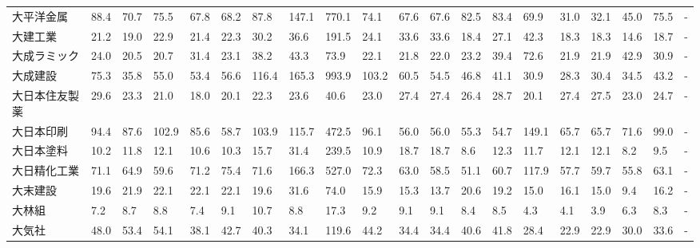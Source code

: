 \begin{longtable}[c]{lp{3mm}p{3mm}p{3mm}p{3mm}p{3mm}p{3mm}p{3mm}p{3mm}p{3mm}p{3mm}p{3mm}p{3mm}p{3mm}p{3mm}p{3mm}p{3mm}p{3mm}p{3mm}p{3mm}}
大平洋金属           &   88.4 &   70.7 &      75.5 &      67.8 &       68.2 &    87.8 &   147.1 &    770.1 &    74.1 &    67.6 &   67.6 &   82.5 &    83.4 &    69.9 &    31.0 &   32.1 &   45.0 &    75.5 &      - \\
大建工業            &   21.2 &   19.0 &      22.9 &      21.4 &       22.3 &    30.2 &    36.6 &    191.5 &    24.1 &    33.6 &   33.6 &   18.4 &    27.1 &    42.3 &    18.3 &   18.3 &   14.6 &    18.7 &      - \\
大成ラミック          &   24.0 &   20.5 &      20.7 &      31.4 &       23.1 &    38.2 &    43.3 &     73.9 &    22.1 &    21.8 &   22.0 &   23.2 &    39.4 &    72.6 &    21.9 &   21.9 &   42.9 &    30.9 &      - \\
大成建設            &   75.3 &   35.8 &      55.0 &      53.4 &       56.6 &   116.4 &   165.3 &    993.9 &   103.2 &    60.5 &   54.5 &   46.8 &    41.1 &    30.9 &    28.3 &   30.4 &   34.5 &    43.2 &      - \\
大日本住友製薬         &   29.6 &   23.3 &      21.0 &      18.0 &       20.1 &    22.3 &    23.6 &     40.6 &    23.0 &    27.4 &   27.4 &   26.4 &    28.7 &    20.1 &    27.4 &   27.5 &   23.0 &    24.7 &      - \\
大日本印刷           &   94.4 &   87.6 &     102.9 &      85.6 &       58.7 &   103.9 &   115.7 &    472.5 &    96.1 &    56.0 &   56.0 &   55.3 &    54.7 &   149.1 &    65.7 &   65.7 &   71.6 &    99.0 &      - \\
大日本塗料           &   10.2 &   11.8 &      12.1 &      10.6 &       10.3 &    15.7 &    31.4 &    239.5 &    10.9 &    18.7 &   18.7 &    8.6 &    12.3 &    11.7 &    12.1 &   12.1 &    8.2 &     9.5 &      - \\
大日精化工業          &   71.1 &   64.9 &      59.6 &      71.2 &       75.4 &    71.6 &   166.3 &    527.0 &    72.3 &    63.0 &   58.5 &   51.1 &    60.7 &   117.9 &    57.7 &   59.7 &   55.8 &    63.1 &      - \\
大末建設            &   19.6 &   21.9 &      22.1 &      22.1 &       22.1 &    19.6 &    31.6 &     74.0 &    15.9 &    15.3 &   13.7 &   20.6 &    19.2 &    15.0 &    16.1 &   15.0 &    9.4 &    16.2 &      - \\
大林組             &    7.2 &    8.7 &       8.8 &       7.4 &        9.1 &    10.7 &     8.8 &     17.3 &     9.2 &     9.1 &    9.1 &    8.4 &     8.5 &     4.3 &     4.1 &    3.9 &    6.3 &     8.3 &      - \\
大気社             &   48.0 &   53.4 &      54.1 &      38.1 &       42.7 &    40.3 &    34.1 &    119.6 &    44.2 &    34.4 &   34.4 &   40.6 &    41.8 &    28.4 &    22.9 &   22.9 &   30.0 &    33.6 &      - \\

\end{longtable}
